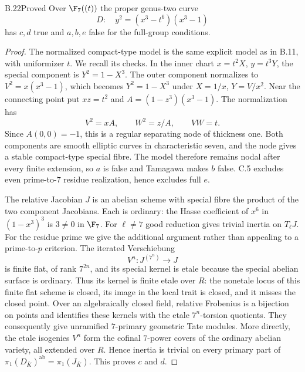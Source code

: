 \begin{claim}{B.22}{Proved}
Over $\F_7((t))$ the proper genus-two curve
\[
 D:\quad y^2=(x^3-t^6)(x^3-1)
\]
has $c,d$ true and $a,b,e$ false for the full-group conditions.
\end{claim}
\begin{proof}
The normalized compact-type model is the same explicit model as in
B.11, with uniformizer $t$. We recall its checks. In the inner chart
$x=t^2X$, $y=t^3Y$, the special component is $Y^2=1-X^3$.
The outer component normalizes to $V^2=x(x^3-1)$, which becomes
$Y^2=1-X^3$ under $X=1/x$, $Y=V/x^2$. Near the connecting point put
$xz=t^2$ and $A=(1-z^3)(x^3-1)$. The normalization has
\[
 V^2=xA,\qquad W^2=z/A,\qquad VW=t.
\]
Since $A(0,0)=-1$, this is a regular separating node of thickness one.
Both components are smooth elliptic curves in characteristic seven,
and the node gives a stable compact-type special fibre. The model
therefore remains nodal after every finite extension, so $a$ is false
and Tamagawa makes $b$ false. C.5 excludes even prime-to-$7$ residue
realization, hence excludes full $e$.

The relative Jacobian $J$ is an abelian scheme with special fibre the
product of the two component Jacobians. Each is ordinary: the Hasse
coefficient of $x^6$ in $(1-x^3)^3$ is $3\ne0$ in $\F_7$.
For $\ell\ne7$ good reduction gives trivial inertia on $T_\ell J$.
For the residue prime we give the additional argument rather than
appealing to a prime-to-$p$ criterion. The iterated Verschiebung
\[
 V^n:J^{(7^n)}\longrightarrow J
\]
is finite flat, of rank $7^{2n}$, and its special kernel is etale because
the special abelian surface is ordinary. Thus its kernel is finite
etale over $R$: the nonetale locus of this finite flat scheme is closed,
its image in the local trait is closed, and it misses the closed point.
Over an algebraically closed field, relative Frobenius is a bijection
on points and identifies these kernels with the etale $7^n$-torsion
quotients. They consequently give unramified $7$-primary geometric
Tate modules. More directly, the etale isogenies $V^n$ form the
cofinal $7$-power covers of the ordinary abelian variety, all extended
over $R$. Hence inertia is trivial on every primary part of
$\pi_1(D_{\bar K})^{\mathrm{ab}}=\pi_1(J_{\bar K})$.
This proves $c$ and $d$.
\end{proof}

